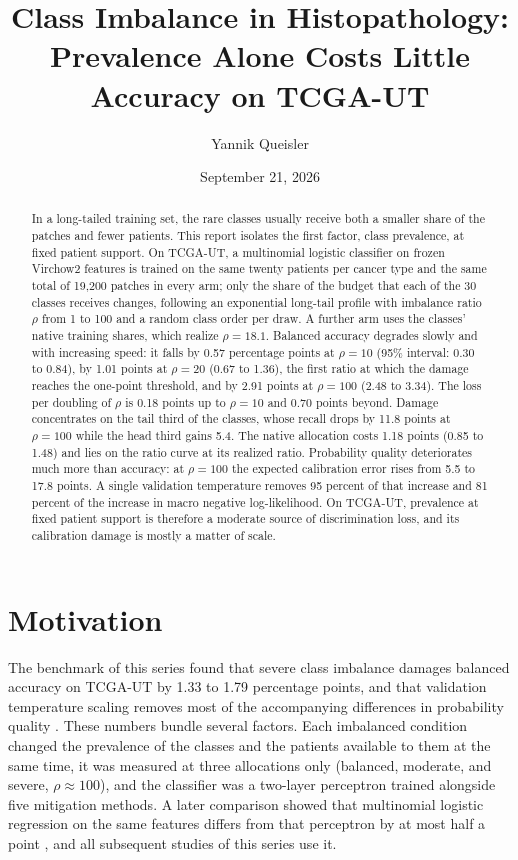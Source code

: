 \documentclass[11pt]{article}
\title{Class Imbalance in Histopathology:\\Prevalence Alone Costs Little Accuracy on TCGA-UT}
\author{Yannik Queisler}
\date{September 21, 2026}
\begin{document}
\raggedbottom
{}
\setlength{\emergencystretch}{2em}
\maketitle
\begin{abstract}
\noindent In a long-tailed training set, the rare classes usually receive both a smaller share of the patches and fewer patients. This report isolates the first factor, class prevalence, at fixed patient support. On TCGA-UT, a multinomial logistic classifier on frozen Virchow2 features is trained on the same twenty patients per cancer type and the same total of 19,200 patches in every arm; only the share of the budget that each of the 30 classes receives changes, following an exponential long-tail profile with imbalance ratio $\rho$ from 1 to 100 and a random class order per draw. A further arm uses the classes' native training shares, which realize $\rho=18.1$. Balanced accuracy degrades slowly and with increasing speed: it falls by 0.57 percentage points at $\rho=10$ (95\% interval: 0.30 to 0.84), by 1.01 points at $\rho=20$ (0.67 to 1.36), the first ratio at which the damage reaches the one-point threshold, and by 2.91 points at $\rho=100$ (2.48 to 3.34). The loss per doubling of $\rho$ is 0.18 points up to $\rho=10$ and 0.70 points beyond. Damage concentrates on the tail third of the classes, whose recall drops by 11.8 points at $\rho=100$ while the head third gains 5.4. The native allocation costs 1.18 points (0.85 to 1.48) and lies on the ratio curve at its realized ratio. Probability quality deteriorates much more than accuracy: at $\rho=100$ the expected calibration error rises from 5.5 to 17.8 points. A single validation temperature removes 95 percent of that increase and 81 percent of the increase in macro negative log-likelihood. On TCGA-UT, prevalence at fixed patient support is therefore a moderate source of discrimination loss, and its calibration damage is mostly a matter of scale.
\end{abstract}

\section{Motivation}
\label{sec:motivation}
The benchmark of this series found that severe class imbalance damages balanced accuracy on TCGA-UT by 1.33 to 1.79 percentage points, and that validation temperature scaling removes most of the accompanying differences in probability quality \citep{queisler2026benchmarkResults,queisler2026benchmarkProtocol}. These numbers bundle several factors. Each imbalanced condition changed the prevalence of the classes and the patients available to them at the same time, it was measured at three allocations only (balanced, moderate, and severe, $\rho\approx100$), and the classifier was a two-layer perceptron trained alongside five mitigation methods. A later comparison showed that multinomial logistic regression on the same features differs from that perceptron by at most half a point \citep{queisler2026patientShortage}, and all subsequent studies of this series use it.
\end{document}
